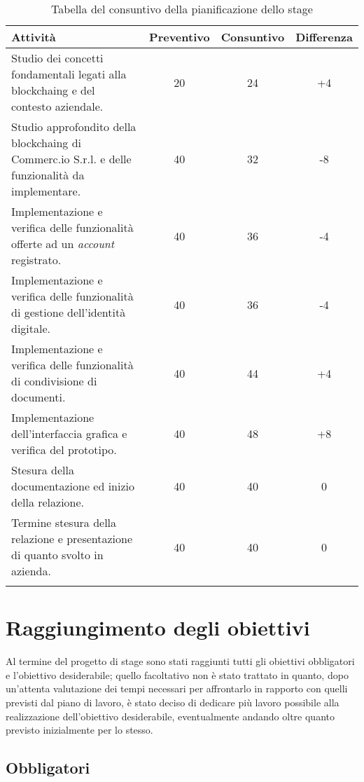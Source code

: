 \begin{longtable}{|p{5.6cm}|c|c|c|}
	\hline
	\rowcolor{gray}
	\textbf{Attività} & \textbf{Preventivo} & \textbf{Consuntivo} & \textbf{Differenza} \\\hline
	Studio dei concetti fondamentali legati alla \gls{blockchaing} e del contesto aziendale. & 20 & 24 & +4 \\\hline
	Studio approfondito della \gls{blockchaing} di Commerc.io S.r.l. e delle funzionalità da implementare. & 40 & 32 & -8 \\\hline
	Implementazione e verifica delle funzionalità offerte ad un \textit{account} registrato. & 40 & 36 & -4 \\\hline
	Implementazione e verifica delle funzionalità di gestione dell'identità digitale. & 40 & 36 & -4 \\\hline
	Implementazione e verifica delle funzionalità di condivisione di documenti. & 40 & 44 & +4 \\\hline
	Implementazione dell'interfaccia grafica e verifica del prototipo. & 40 & 48 & +8 \\\hline
	Stesura della documentazione ed inizio della relazione. & 40 & 40 & 0 \\\hline
	Termine stesura della relazione e presentazione di quanto svolto in azienda. & 40 & 40 & 0 \\\hline
	
	\caption{Tabella del consuntivo della pianificazione dello stage}
	\label{tab:rendiconto}
\end{longtable}

\section{Raggiungimento degli obiettivi}

Al termine del progetto di stage sono stati raggiunti tutti gli obiettivi obbligatori e l'obiettivo desiderabile; quello facoltativo non è stato trattato in quanto, dopo un'attenta valutazione dei tempi necessari per affrontarlo in rapporto con quelli previsti dal piano di lavoro, è stato deciso di dedicare più lavoro possibile alla realizzazione dell'obiettivo desiderabile, eventualmente andando oltre quanto previsto inizialmente per lo stesso.

\subsection{Obbligatori}

